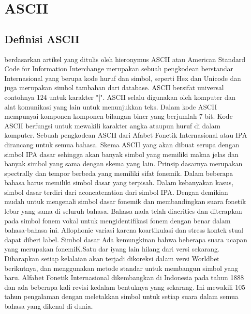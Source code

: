 

	\section{ASCII}
		\subsection{Definisi ASCII}
		berdasarkan artikel yang ditulis oleh hieronymus \cite{hieronymus1993ascii}
	ASCII atau American Standard Code for Information Interchange merupakan sebuah pengkodean berstandar Internasional yang berupa kode huruf dan simbol, seperti Hex dan Unicode dan juga merupakan simbol tambahan dari database. ASCII bersifat universal contohnya 124 untuk karakter "|". ASCII selalu digunakan oleh komputer dan alat komunikasi yang lain untuk menunjukkan teks.
    Dalam kode ASCII mempunyai komponen komponen bilangan biner yang berjumlah 7 bit. Kode ASCII berfungsi untuk mewakili karakter angka ataupun huruf di dalam komputer. Sebuah pengkodean ASCII dari Afabet Fonetik Internasional atau IPA dirancang untuk semua bahasa. Skema ASCII yang akan dibuat serupa dengan simbol IPA dasar sehingga akan banyak simbol yang memiliki makna jelas dan banyak simbol yang sama dengan skema yang lain. Prinsip dasarnya merupakan spectrally dan tempor berbeda yang memiliki sifat fonemik.
    Dalam beberapa bahasa harus memiliki simbol dasar yang terpisah. Dalam kebanyakan kasus, simbol dasar terdiri dari aconcatenation dari simbol IPA. Dengan demikian mudah untuk mengenali simbol dasar fonemik dan membandingkan suara fonetik lebar yang sama di seluruh bahasa. Bahasa nada telah diacritics dan diterapkan pada simbol fonem vokal untuk mengidentifikasi fonem dengan benar dalam bahasa-bahasa ini. Allophonic variasi karena koartikulasi dan stress kontek stual dapat diberi label.
	Simbol dasar Ada kemungkinan bahwa beberapa suara ucapan yang merupakan fonemiK.Satu dar iyang lain hilang dari versi sekarang. Diharapkan setiap kelalaian akan terjadi dikoreksi dalam versi Worldbet berikutnya, dan menggunakan metode standar untuk membangun simbol yang baru. Alfabet Fonetik Internasional dikembangkan di Indonesia pada tahun 1888 dan ada beberapa kali revisi kedalam bentuknya yang sekarang. Ini mewakili 105 tahun pengalaman dengan meletakkan simbol untuk setiap suara dalam semua bahasa yang dikenal di dunia. 
